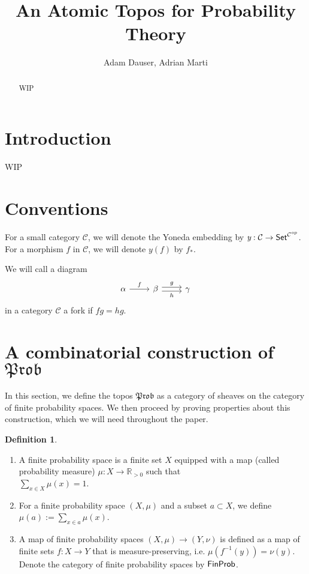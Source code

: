 \documentclass[a4paper]{amsproc}
\title{An Atomic Topos for Probability Theory}
\author{Adam Dauser, Adrian Marti}
\date{}
\theoremstyle{plain}
\theoremstyle{definition}
\newtheorem{definition}[theorem]{Definition}
\theoremstyle{remark}
\numberwithin{equation}{section}
\newcommand{\y}{\textit{y}}
\newcommand{\Set}{\textup{\textsf{Set}}}
\newcommand{\FinProb}{\textup{\textsf{FinProb}}}
\newcommand{\C}{\mathcal{C}}
\newcommand{\Prob}{\mathfrak{Prob}}
\begin{document}
\begin{abstract}
WIP
\end{abstract}

\maketitle

\tableofcontents


\section{Introduction}

WIP

\section{Conventions} \label{conventions}

For a small category $\C$, we will denote the Yoneda embedding by $\y: \C \to \Set^{\C^{op}}$. For a morphism $f$ in $\C$, we will denote $\y(f)$ by $f_*$.

We will call a diagram
\[
\begin{tikzcd}
\alpha \arrow[r, "f"] & \beta \arrow[r, "g", shift left] \arrow[r, "h"', shift right] & \gamma
\end{tikzcd}
\]
in a category $\C$ a fork if $fg = hg$.

\section{A combinatorial construction of $\Prob$}

In this section, we define the topos $\Prob$ as a category of sheaves on the category of finite probability spaces. We then proceed by proving properties about this construction, which we will need throughout the paper.


\begin{definition}
    \mbox{}
    \begin{enumerate}
        \item A finite probability space is a finite set $X$ equipped with a map (called probability measure) $\mu: X \to \mathbb{R}_{>0}$ such that \\ $\sum_{x \in X} \mu(x) = 1$.
        \item For a finite probability space $(X,\mu)$ and a subset $a \subset X$, we define $\mu(a) := \sum_{x \in a} \mu(x)$.
        \item A map of finite probability spaces $(X,\mu) \to (Y,\nu)$ is defined as a map of finite sets $f: X \to Y$ that is measure-preserving, i.e. $\mu(f^{-1}(y)) = \nu(y)$. Denote the category of finite probability spaces by $\FinProb$.
    \end{enumerate}
\end{definition}
\end{document}
